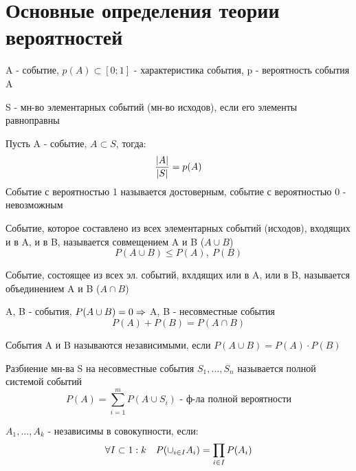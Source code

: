 \documentclass[discrete.tex]{subfiles}
\begin{document}
\section{Основные определения теории вероятностей}
\begin{definition}
  A - событие, $p(A) \subset [0;1]$ - характеристика события, p - вероятность события A
\end{definition}

\begin{definition}
  S - мн-во элементарных событий (мн-во исходов), если его элементы равноправны
\end{definition}

\begin{definition}
  Пусть A - событие, $A \subset S$, тогда:
  \[\frac{\left|A\right|}{\left|S\right|} = p(A)\]
  Событие с вероятностью 1 называется достоверным, событие с вероятностью 0 - невозможным
\end{definition}

\begin{definition}
  Событие, которое составлено из всех элементарных событий (исходов), входящих и в A, и в B, называется совмещением A и B ($A \cup B$)
  \[P(A \cup B) \leqslant P(A),\ P(B)\]
\end{definition}

\begin{definition}
  Событие, состоящее из всех эл. событий, вхлдящих или в A, или в B, называется объединением A и B ($A \cap B$)
\end{definition}

\begin{definition}
  A, B - события, $P(A \cup B) = 0 \Rightarrow$ A, B - несовместные события
  \[P(A) + P(B) = P(A \cap B)\]
\end{definition}

\begin{definition}
  События A и B называются независимыми, если $P(A \cup B) = P(A) \cdot P(B)$
\end{definition}

\begin{definition}
  Разбиение мн-ва S на несовместные события $S_1,...,S_n$ называется полной системой событий
  \[P(A) = \sum_{i=1}^m P(A \cup S_i) \text{ - ф-ла полной вероятности}\]
\end{definition}

\begin{definition}
  $A_1,...,A_k$ - независимы в совокупности, если:
  \[\forall I \subset 1:k \quad P(\cup_{i \in I}A_i) = \prod_{i \in I} P(A_i)\]

\end{definition}
\end{document}
